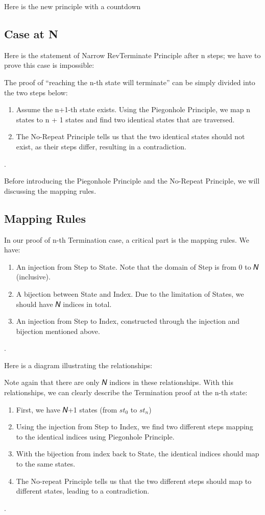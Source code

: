 Here is the new principle with a countdown


\subsection{ Case at N }
Here is the statement of Narrow RevTerminate Principle after n steps; we have to prove this case is impossible:


The proof of ``reaching the n-th state will terminate'' can be simply divided into the two steps below:
\begin{enumerate}[1.]
    \item Assume the n+1-th state exists. Using the Piegonhole Principle, we map n states to n + 1 states and find two identical states that are traversed.
    \item The No-Repeat Principle tells us that the two identical states should not exist, as their steps differ, resulting in a contradiction.
\end{enumerate}.

Before introducing the Piegonhole Principle and the No-Repeat Principle, we will discussing the mapping rules.

\subsection{ Mapping Rules }
In our proof of n-th Termination case, a critical part is the mapping rules.
We have:
\begin{enumerate}[1.]
    \item An injection from Step to State.  Note that the domain of Step is from 0 to 𝑁 (inclusive).
    \item A bijection between State and Index. Due to the limitation of States, we should have 𝑁 indices in total.
    \item An injection from Step to Index, constructed through the injection and bijection mentioned above.
\end{enumerate}.

Here is a diagram illustrating the relationships:


Note again that there are only 𝑁 indices in these relationships.
With this relationships, we can clearly describe the Termination proof at the n-th state:
\begin{enumerate}[1.]
    \item First, we have 𝑁+1 states (from $st_{0}$ to $st_{n}$)
    \item Using the injection from Step to Index, we find two different steps mapping to the identical indices using Piegonhole Principle.
    \item With the bijection from index back to State, the identical indices should map to the same states.
    \item The No-repeat Principle tells us that the two different steps should map to different states, leading to a contradiction.
\end{enumerate}.

